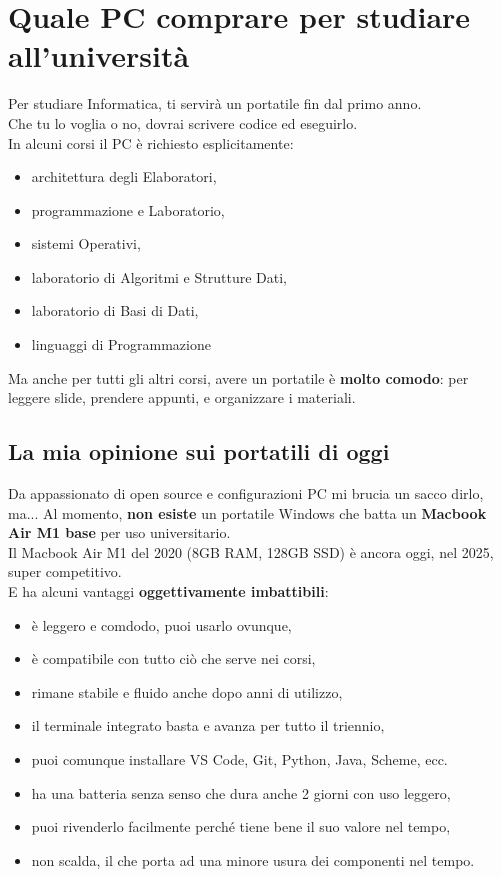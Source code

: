 \documentclass[18pt]{extarticle}
\begin{document}
\section{Quale PC comprare per studiare all’università}
Per studiare Informatica, ti servirà un portatile fin dal primo anno.\\
Che tu lo voglia o no, dovrai scrivere codice ed eseguirlo.\\
In alcuni corsi il PC è richiesto esplicitamente:
\begin{itemize}
\item architettura degli Elaboratori,
\item programmazione e Laboratorio,
\item sistemi Operativi,
\item laboratorio di Algoritmi e Strutture Dati,
\item laboratorio di Basi di Dati,
\item linguaggi di Programmazione
\end{itemize}
Ma anche per tutti gli altri corsi, avere un portatile è \textbf{molto comodo}: per leggere slide, prendere appunti, e organizzare i materiali.


\subsection{La mia opinione sui portatili di oggi}
Da appassionato di open source e configurazioni PC mi brucia un sacco dirlo, ma...
Al momento, \textbf{non esiste} un portatile Windows che batta un \textbf{Macbook Air M1 base} per uso universitario.\\
Il Macbook Air M1 del 2020 (8GB RAM, 128GB SSD) è ancora oggi, nel 2025, super competitivo.\\
E ha alcuni vantaggi \textbf{oggettivamente imbattibili}:
\begin{itemize}
\item è leggero e comdodo, puoi usarlo ovunque,
\item è compatibile con tutto ciò che serve nei corsi,
\item rimane stabile e fluido anche dopo anni di utilizzo,
\item il terminale integrato basta e avanza per tutto il triennio,
\item puoi comunque installare VS Code, Git, Python, Java, Scheme, ecc.
\item ha una batteria senza senso che dura anche 2 giorni con uso leggero,
\item puoi rivenderlo facilmente perché tiene bene il suo valore nel tempo,
\item non scalda, il che porta ad una minore usura dei componenti nel tempo.
\end{itemize}
\end{document}
